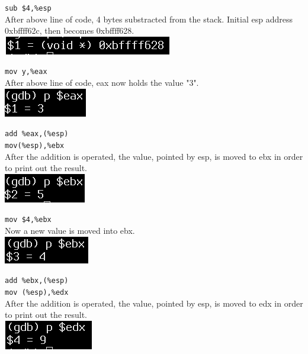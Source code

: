 \documentclass{article}
\begin{document}
\verb|sub $4,%esp| \\
After above line of code, 4 bytes substracted from the stack. Initial esp address 0xbffff62c, then becomes 0xbffff628. \\
\includegraphics[scale = 0.6]{pesp1.png} \\
\noindent{\color{red}\rule{\linewidth}{0.5mm}}

\verb|mov y,%eax| \\
After above line of code, eax now holds the value "3". \\
\includegraphics[scale = 0.6]{eax1.png} \\
\noindent{\color{red}\rule{\linewidth}{0.5mm}}

\verb|add %eax,(%esp)| \\
\verb|mov(%esp),%ebx | \\
After the addition is operated, the value, pointed by esp, is moved to ebx in order to print out the result. \\
\includegraphics[scale = 0.6]{ebx1.png} \\
\noindent{\color{red}\rule{\linewidth}{0.5mm}}

\verb|mov $4,%ebx| \\
Now a new value is moved into ebx. \\
\includegraphics[scale = 0.6]{ebx2.png} \\
\noindent{\color{red}\rule{\linewidth}{0.5mm}}
\clearpage

\verb|add %ebx,(%esp)| \\
\verb|mov (%esp),%edx| \\
After the addition is operated, the value, pointed by esp, is moved to edx in order to print out the result. \\
\includegraphics[scale = 0.6]{edx1.png} \\
\noindent{\color{red}\rule{\linewidth}{0.5mm}}
\end{document}
